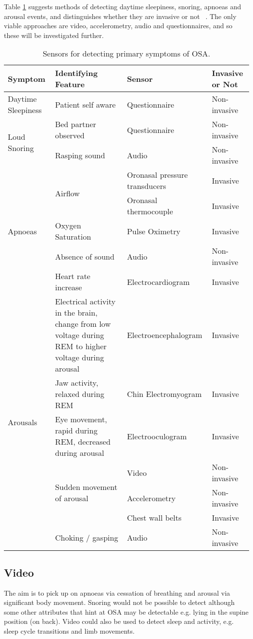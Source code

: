 Table \ref{table:X3} suggests methods of detecting daytime sleepiness, snoring, apnoeas and arousal events, and distinguishes whether they are invasive or not ~\cite{iber2007aasm}. The only viable approaches are video, accelerometry, audio and questionnaires, and so these will be investigated further.

\begin{table}[h]
\centering
\begin{tabular}{l l l l}
\toprule
Symptom&Identifying Feature&Sensor&Invasive or Not\\ \midrule
Daytime Sleepiness&Patient self aware&Questionnaire&Non-invasive\\ 
\multirow{2}{*}{Loud Snoring}&Bed partner observed&Questionnaire&Non-invasive\\ 
&Rasping sound&Audio&Non-invasive\\ 
\multirow{5}{*}{Apnoeas}&\multirow{2}{*}{Airflow}&Oronasal pressure transducers&Invasive\\ 
&&Oronasal thermocouple&Invasive\\ 
&Oxygen Saturation&Pulse Oximetry&Invasive\\ 
&Absence of sound&Audio&Non-invasive\\ 
&Heart rate increase&Electrocardiogram&Invasive\\ 
\multirow{7}{*}{Arousals}&Electrical activity in the brain, change from low voltage \newline during REM to higher voltage during arousal&Electroencephalogram&Invasive\\ 
&Jaw activity, relaxed during REM&Chin Electromyogram&Invasive\\ 
&Eye movement, rapid during REM, decreased during arousal&Electrooculogram&Invasive\\ 
&\multirow{3}{*}{Sudden movement of arousal}&Video&Non-invasive\\ 
&&Accelerometry&Non-invasive\\ 
&&Chest wall belts&Invasive\\ 
&Choking / gasping&Audio&Non-invasive\\ \bottomrule
\end{tabular}
\caption{Sensors for detecting primary symptoms of OSA.}
\label{table:X3}
\end{table}
\subsection{Video}
The aim is to pick up on apnoeas via cessation of breathing and arousal via significant body movement. Snoring would not be possible to detect although some other attributes that hint at OSA may be detectable e.g. lying in the supine position (on back). Video could also be used to detect sleep and activity, e.g. sleep cycle transitions and limb movements. 

